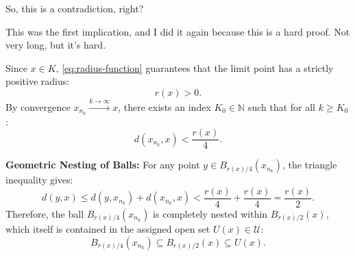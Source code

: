 \begin{proofWrapper}
\begin{speech}[00:07:35 - 00:10:05]
So, this is a contradiction, right? 

This was the first implication, and I did it again because this is a hard proof. Not very long, but it's hard.
\end{speech}

\begin{content}
Since $x \in K$, \cref{eq:radius-function} guarantees that the limit point has a strictly positive radius:
\[
r(x) > 0.
\]
By convergence $x_{n_k} \xrightarrow{k \to \infty} x$, there exists an index $K_0 \in \mathbb{N}$ such that for all $k \ge K_0$:
\begin{equation}\label{eq:close-to-limit}
d(x_{n_k}, x) < \frac{r(x)}{4}.
\end{equation}

\textbf{Geometric Nesting of Balls:}
For any point $y \in B_{r(x)/4}(x_{n_k})$, the triangle inequality gives:
\[
d(y, x) \le d(y, x_{n_k}) + d(x_{n_k}, x) < \frac{r(x)}{4} + \frac{r(x)}{4} = \frac{r(x)}{2}.
\]
Therefore, the ball $B_{r(x)/4}(x_{n_k})$ is completely nested within $B_{r(x)/2}(x)$, which itself is contained in the assigned open set $U(x) \in \mathcal{U}$:
\begin{equation}\label{eq:nested-ball-inclusion}
B_{r(x)/4}(x_{n_k}) \subseteq B_{r(x)/2}(x) \subseteq U(x).
\end{equation}

\begin{center}
\end{center}
\end{content}
\end{proofWrapper}

